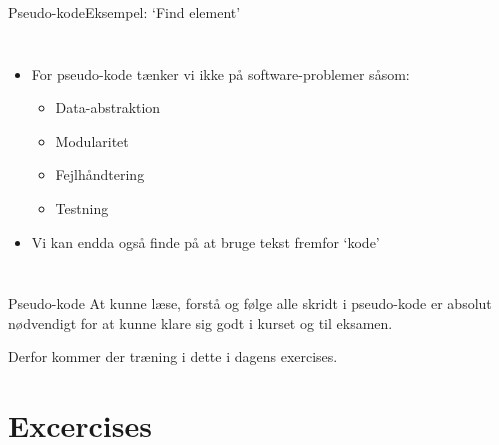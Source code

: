 \documentclass{beamer}
\begin{document}
\begin{frame}{Pseudo-kode}{Eksempel: `Find element'}

    \begin{columns}
        \begin{itemize}
            \item For pseudo-kode tænker vi ikke på software-problemer såsom:
                \begin{itemize}
                    \item Data-abstraktion
                    \item Modularitet
                    \item Fejlhåndtering
                    \item Testning
                \end{itemize}
            \item Vi kan endda også finde på at bruge tekst fremfor `kode'
        \end{itemize}



    \end{columns}

\end{frame}

\begin{frame}{Pseudo-kode}
    At kunne læse, forstå og følge alle skridt i pseudo-kode er \alert{absolut
    nødvendigt} for at kunne klare sig godt i kurset og til eksamen.

    \pause
    \medskip

    Derfor kommer der træning i dette i dagens exercises.
\end{frame}

\section{Excercises}%
\end{document}
